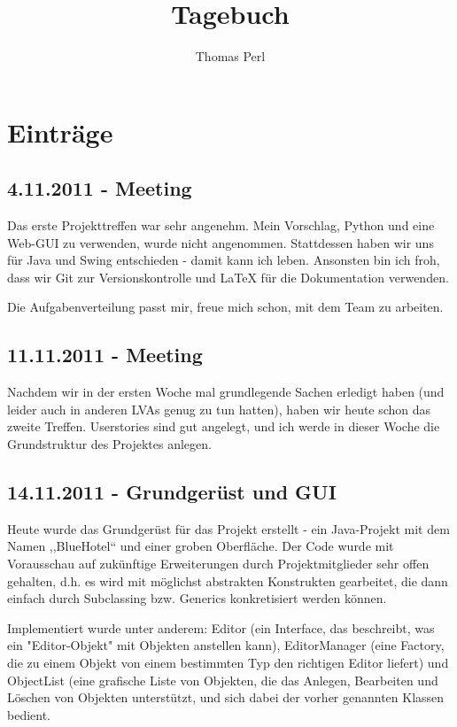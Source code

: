 \documentclass[11pt]{scrartcl}
\title{Tagebuch}
\author{Thomas Perl}
\begin{document}
\maketitle

\section{Einträge}

\subsection{4.11.2011 - Meeting}

Das erste Projekttreffen war sehr angenehm. Mein Vorschlag, Python und eine
Web-GUI zu verwenden, wurde nicht angenommen. Stattdessen haben wir uns für
Java und Swing entschieden - damit kann ich leben. Ansonsten bin ich froh,
dass wir Git zur Versionskontrolle und LaTeX für die Dokumentation verwenden.

Die Aufgabenverteilung passt mir, freue mich schon, mit dem Team zu arbeiten.


\subsection{11.11.2011 - Meeting}

Nachdem wir in der ersten Woche mal grundlegende Sachen erledigt haben (und
leider auch in anderen LVAs genug zu tun hatten), haben wir heute schon das
zweite Treffen. Userstories sind gut angelegt, und ich werde in dieser Woche
die Grundstruktur des Projektes anlegen.


\subsection{14.11.2011 - Grundgerüst und GUI}

Heute wurde das Grundgerüst für das Projekt erstellt - ein Java-Projekt mit
dem Namen ,,BlueHotel`` und einer groben Oberfläche. Der Code wurde mit
Vorausschau auf zukünftige Erweiterungen durch Projektmitglieder sehr offen
gehalten, d.h. es wird mit möglichst abstrakten Konstrukten gearbeitet, die
dann einfach durch Subclassing bzw. Generics konkretisiert werden können.

Implementiert wurde unter anderem: Editor (ein Interface, das beschreibt, was
ein "Editor-Objekt" mit Objekten anstellen kann), EditorManager (eine Factory,
die zu einem Objekt von einem bestimmten Typ den richtigen Editor liefert) und
ObjectList (eine grafische Liste von Objekten, die das Anlegen, Bearbeiten und
Löschen von Objekten unterstützt, und sich dabei der vorher genannten Klassen
bedient.
\end{document}
